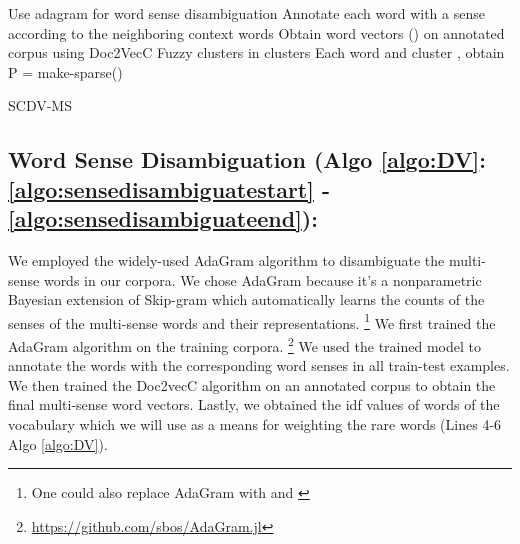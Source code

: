 \documentclass{ecai}
\begin{document}
\begin{algorithm}[h!]
    \SetAlgoNoLine
    \setlength{\textfloatsep}{0.0pt}
    \vspace{0.5em}
    Use adagram for word sense disambiguation\;
    \label{algo:sensedisambiguatestart}
    Annotate each word with a sense according to the neighboring context words\;
    Obtain word vectors () on annotated corpus using Doc2VecC\;
    \label{algo:sensedisambiguateend}
    \label{algo:gmmstart}
    \vspace{0.5em}
    \vspace{0.5em}
    Fuzzy clusters  in  clusters\;
    Each word  and cluster , obtain P \; 
     = make-sparse()\;
    \label{algo:gmmend}
    \label{algo:wtvstart}
    \vspace{0.5em}
    \vspace{0.5em}
    \vspace{0.5em}
    \vspace{0.5em}
    \label{algo:wtvend}
\caption{SCDV-MS}
\label{algo:DV}
\end{algorithm}
\subsection{Word Sense Disambiguation (Algo \ref{algo:DV}: \ref{algo:sensedisambiguatestart} - \ref{algo:sensedisambiguateend}):}
\label{algo:wsd}
We employed the widely-used AdaGram \cite{bartunov2016breaking} algorithm to disambiguate the multi-sense words in our corpora. We chose AdaGram because it's a nonparametric Bayesian extension of Skip-gram which automatically learns the counts of the senses of the multi-sense words and their representations. \footnote{One could also replace AdaGram with \cite{dai2017mixture} and \cite{athiwaratkun2018probabilistic}} We first trained the AdaGram algorithm on the training corpora. \footnote{ \url{https://github.com/sbos/AdaGram.jl}} We used the trained model to annotate the words with the corresponding word senses in all train-test examples. We then trained the Doc2vecC algorithm on an annotated corpus to obtain the final multi-sense word vectors. Lastly, we obtained the idf values of words of the vocabulary which we will use as a means for weighting the rare words (Lines 4-6 Algo \ref{algo:DV}).
\end{document}
